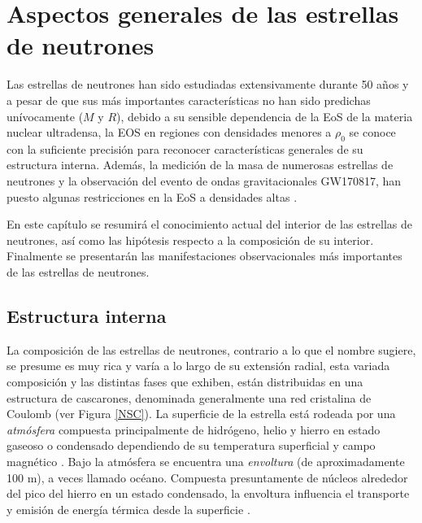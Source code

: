 \chapter{Aspectos generales de las estrellas de neutrones}

Las estrellas de neutrones han sido estudiadas extensivamente durante 50 años y a pesar de que sus más importantes características no han sido predichas unívocamente ($M$ y $R$), debido a su sensible dependencia de la EoS de la materia nuclear ultradensa,%
la EOS en regiones con densidades menores a $\rho_0$ se conoce con la suficiente precisión \cite{Haensel2007,Chamel2008} para reconocer características generales de su estructura interna. Además, la medición de la masa de numerosas estrellas de neutrones y la observación del evento de ondas gravitacionales GW170817, han puesto algunas restricciones en la EoS a densidades altas \cite{Rezzolla2017}. 

En este capítulo se resumirá el conocimiento actual del interior de las estrellas de neutrones, así como las hipótesis respecto a la composición de su interior. Finalmente se presentarán las manifestaciones observacionales más importantes de las estrellas de neutrones.


\section{Estructura interna}
La composición de las estrellas de neutrones, contrario a lo que el nombre sugiere, se presume es muy rica y varía a lo largo de su extensión radial, esta variada composición y las distintas fases que exhiben, están distribuidas en una estructura de cascarones, denominada generalmente una red cristalina de Coulomb (ver Figura \ref{NSC}).
La superficie de la estrella está rodeada por una \emph{atmósfera} compuesta principalmente de hidrógeno, helio y hierro en estado gaseoso o condensado dependiendo de su temperatura superficial y campo magnético \cite{Zavlin2002}. %
Bajo la atmósfera se encuentra una \emph{envoltura} (de aproximadamente 100 \si{\metre}), a veces llamado océano. Compuesta presuntamente de núcleos alrededor del pico del hierro en un estado condensado, la envoltura influencia el transporte y emisión de energía térmica desde la superficie \cite{Piekarewicz2013,Potekhin2010,Lattimer2004}.

